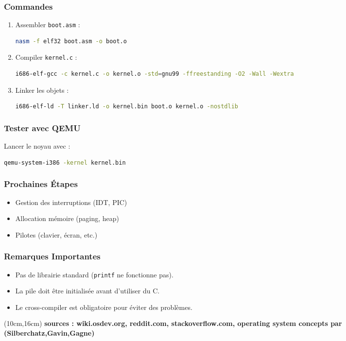 \documentclass{article}
\begin{document}
\subsubsection{Commandes}
\begin{enumerate}
    \item Assembler \texttt{boot.asm} :
    \begin{lstlisting}[language=bash]
    nasm -f elf32 boot.asm -o boot.o
    \end{lstlisting}
    
    \item Compiler \texttt{kernel.c} :
    \begin{lstlisting}[language=bash]
    i686-elf-gcc -c kernel.c -o kernel.o -std=gnu99 -ffreestanding -O2 -Wall -Wextra
    \end{lstlisting}
    
    \item Linker les objets :
    \begin{lstlisting}[language=bash]
    i686-elf-ld -T linker.ld -o kernel.bin boot.o kernel.o -nostdlib
    \end{lstlisting}
\end{enumerate}

\subsubsection{Tester avec QEMU}
Lancer le noyau avec :
\begin{lstlisting}[language=bash]
qemu-system-i386 -kernel kernel.bin
\end{lstlisting}

\subsubsection{Prochaines Étapes}
\begin{itemize}
    \item Gestion des interruptions (IDT, PIC)
    \item Allocation mémoire (paging, heap)
    \item Pilotes (clavier, écran, etc.)
\end{itemize}

\subsubsection{Remarques Importantes}
\begin{itemize}
    \item Pas de librairie standard (\texttt{printf} ne fonctionne pas).
    \item La pile doit être initialisée avant d'utiliser du C.
    \item Le cross-compiler est obligatoire pour éviter des problèmes.
\end{itemize}

\begin{textblock*}{10cm}(10cm,16cm) %
    \textbf{sources : wiki.osdev.org, reddit.com, stackoverflow.com, operating system concepts par (Silberchatz,Gavin,Gagne)}
\end{textblock*}
\end{document}
